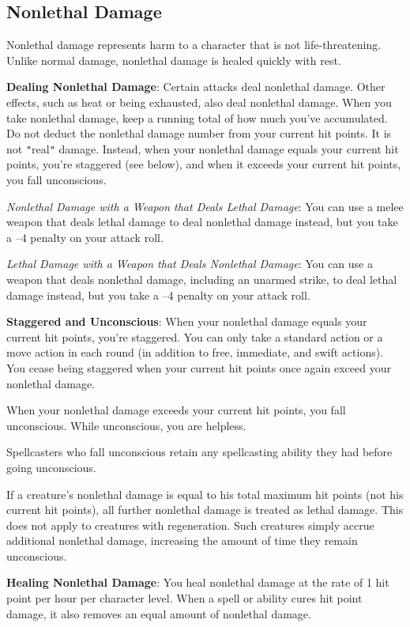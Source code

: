 \subsection{Nonlethal Damage}

				
Nonlethal damage represents harm to a character that is not life-threatening. Unlike normal damage, nonlethal damage is healed quickly with rest.
				
\textbf{Dealing Nonlethal Damage}: Certain attacks deal nonlethal damage. Other effects, such as heat or being exhausted, also deal nonlethal damage. When you take nonlethal damage, keep a running total of how much you've accumulated. Do not deduct the nonlethal damage number from your current hit points. It is not \texttt{{}"{}}real\texttt{{}"{}} damage. Instead, when your nonlethal damage equals your current hit points, you're staggered (see below), and when it exceeds your current hit points, you fall unconscious.
				
\textit{Nonlethal Damage with a Weapon that Deals Lethal Damage}: You can use a melee weapon that deals lethal damage to deal nonlethal damage instead, but you take a --4 penalty on your attack roll.
				
\textit{Lethal Damage with a Weapon that Deals Nonlethal Damage}: You can use a weapon that deals nonlethal damage, including an unarmed strike, to deal lethal damage instead, but you take a --4 penalty on your attack roll.
				
\textbf{Staggered and Unconscious}: When your nonlethal damage equals your current hit points, you're staggered. You can only take a standard action or a move action in each round (in addition to free, immediate, and swift actions). You cease being staggered when your current hit points once again exceed your nonlethal damage.
				
When your nonlethal damage exceeds your current hit points, you fall unconscious. While unconscious, you are helpless.
				
Spellcasters who fall unconscious retain any spellcasting ability they had before going unconscious.
				
If a creature's nonlethal damage is equal to his total maximum hit points (not his current hit points), all further nonlethal damage is treated as lethal damage. This does not apply to creatures with regeneration. Such creatures simply accrue additional nonlethal damage, increasing the amount of time they remain unconscious.
				
\textbf{Healing Nonlethal Damage}: You heal nonlethal damage at the rate of 1 hit point per hour per character level. When a spell or ability cures hit point damage, it also removes an equal amount of nonlethal damage.
				
